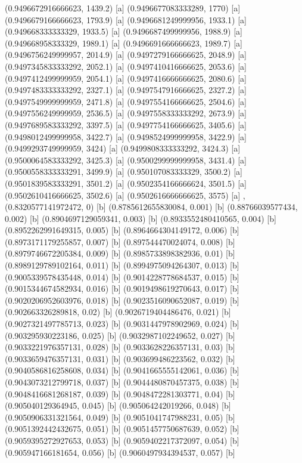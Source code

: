 {{{(0.9496672916666623, 1439.2) [a] 
(0.9496677083333289, 1770) [a] 
(0.9496679166666623, 1793.9) [a] 
(0.9496681249999956, 1933.1) [a] 
(0.949668333333329, 1933.5) [a] 
(0.9496687499999956, 1988.9) [a] 
(0.949668958333329, 1989.1) [a] 
(0.9496691666666623, 1989.7) [a] 
(0.9496756249999957, 2014.9) [a] 
(0.9497279166666625, 2048.9) [a] 
(0.9497345833333292, 2052.1) [a] 
(0.9497410416666625, 2053.6) [a] 
(0.9497412499999959, 2054.1) [a] 
(0.9497416666666625, 2080.6) [a] 
(0.9497483333333292, 2327.1) [a] 
(0.9497547916666625, 2327.2) [a] 
(0.9497549999999959, 2471.8) [a] 
(0.9497554166666625, 2504.6) [a] 
(0.9497556249999959, 2536.5) [a] 
(0.9497558333333292, 2673.9) [a] 
(0.9497689583333292, 3397.5) [a] 
(0.9497754166666625, 3405.6) [a] 
(0.9498012499999958, 3422.7) [a] 
(0.9498524999999958, 3422.9) [a] 
(0.9499293749999959, 3424) [a] 
(0.9499808333333292, 3424.3) [a] 
(0.9500064583333292, 3425.3) [a] 
(0.9500299999999958, 3431.4) [a] 
(0.9500558333333291, 3499.9) [a] 
(0.950107083333329, 3500.2) [a] 
(0.9501839583333291, 3501.2) [a] 
(0.9502354166666624, 3501.5) [a] 
(0.9502610416666625, 3502.6) [a] 
(0.9502616666666625, 3575) [a] 
},{(0.8320577141972472, 0) [b] 
(0.8785612655830084, 0.001) [b] 
(0.88766039577434, 0.002) [b] 
(0.8904697129059341, 0.003) [b] 
(0.8933552480410565, 0.004) [b] 
(0.8952262991649315, 0.005) [b] 
(0.8964664304149172, 0.006) [b] 
(0.8973171179255857, 0.007) [b] 
(0.897544470024074, 0.008) [b] 
(0.8979746672205384, 0.009) [b] 
(0.8985733898382936, 0.01) [b] 
(0.8989129789102164, 0.011) [b] 
(0.8994975094264307, 0.013) [b] 
(0.9005339578435448, 0.014) [b] 
(0.9014228778684537, 0.015) [b] 
(0.9015344674582934, 0.016) [b] 
(0.9019498619270643, 0.017) [b] 
(0.9020206952603976, 0.018) [b] 
(0.9023516090652087, 0.019) [b] 
(0.902663326289818, 0.02) [b] 
(0.9026719404486476, 0.021) [b] 
(0.9027321497785713, 0.023) [b] 
(0.9031447978902969, 0.024) [b] 
(0.903295930223186, 0.025) [b] 
(0.9032987102249652, 0.027) [b] 
(0.9033221976357131, 0.028) [b] 
(0.9033628226357131, 0.03) [b] 
(0.9033659476357131, 0.031) [b] 
(0.903699486223562, 0.032) [b] 
(0.9040586816258608, 0.034) [b] 
(0.9041665555142061, 0.036) [b] 
(0.9043073212799718, 0.037) [b] 
(0.9044480870457375, 0.038) [b] 
(0.9048416681268187, 0.039) [b] 
(0.9048472281303771, 0.04) [b] 
(0.905040129364945, 0.045) [b] 
(0.905064242019266, 0.048) [b] 
(0.9050906331321564, 0.049) [b] 
(0.9051041747988231, 0.05) [b] 
(0.9051392442432675, 0.051) [b] 
(0.9051457750687639, 0.052) [b] 
(0.9059395272927653, 0.053) [b] 
(0.9059402217372097, 0.054) [b] 
(0.905947166181654, 0.056) [b] 
(0.9060497934394537, 0.057) [b] 
}}}
